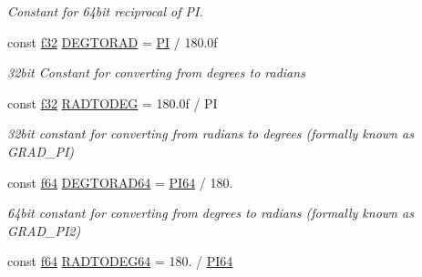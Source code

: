 \begin{DoxyCompactItemize}
\begin{DoxyCompactList}\small\item\em Constant for 64bit reciprocal of PI. \end{DoxyCompactList}\item 
const \hyperlink{namespaceirr_a0277be98d67dc26ff93b1a6a1d086b07}{f32} \hyperlink{namespaceirr_1_1core_a4b91e69e51a2e374aec940cba3869028}{D\+E\+G\+T\+O\+R\+AD} = \hyperlink{namespaceirr_1_1core_a26d877e2caf3e6f31c298a0417a0707e}{PI} / 180.\+0f\hypertarget{namespaceirr_1_1core_a4b91e69e51a2e374aec940cba3869028}{}\label{namespaceirr_1_1core_a4b91e69e51a2e374aec940cba3869028}

\begin{DoxyCompactList}\small\item\em 32bit Constant for converting from degrees to radians \end{DoxyCompactList}\item 
const \hyperlink{namespaceirr_a0277be98d67dc26ff93b1a6a1d086b07}{f32} \hyperlink{namespaceirr_1_1core_ae3a530e0ef661960b7af89f07d817bd5}{R\+A\+D\+T\+O\+D\+EG} = 180.\+0f / PI\hypertarget{namespaceirr_1_1core_ae3a530e0ef661960b7af89f07d817bd5}{}\label{namespaceirr_1_1core_ae3a530e0ef661960b7af89f07d817bd5}

\begin{DoxyCompactList}\small\item\em 32bit constant for converting from radians to degrees (formally known as G\+R\+A\+D\+\_\+\+PI) \end{DoxyCompactList}\item 
const \hyperlink{namespaceirr_a1325b02603ad449f92c68fc640af9b28}{f64} \hyperlink{namespaceirr_1_1core_a8e21b5969c8292857f7c9c5dcfd61c35}{D\+E\+G\+T\+O\+R\+A\+D64} = \hyperlink{namespaceirr_1_1core_a166af519140dc00cbd88684e835086f8}{P\+I64} / 180.\hypertarget{namespaceirr_1_1core_a8e21b5969c8292857f7c9c5dcfd61c35}{}\label{namespaceirr_1_1core_a8e21b5969c8292857f7c9c5dcfd61c35}

\begin{DoxyCompactList}\small\item\em 64bit constant for converting from degrees to radians (formally known as G\+R\+A\+D\+\_\+\+P\+I2) \end{DoxyCompactList}\item 
const \hyperlink{namespaceirr_a1325b02603ad449f92c68fc640af9b28}{f64} \hyperlink{namespaceirr_1_1core_ae7afeb48af12f5f5130cd179a644ec58}{R\+A\+D\+T\+O\+D\+E\+G64} = 180. / \hyperlink{namespaceirr_1_1core_a166af519140dc00cbd88684e835086f8}{P\+I64}\hypertarget{namespaceirr_1_1core_ae7afeb48af12f5f5130cd179a644ec58}{}\label{namespaceirr_1_1core_ae7afeb48af12f5f5130cd179a644ec58}


\end{DoxyCompactItemize}
